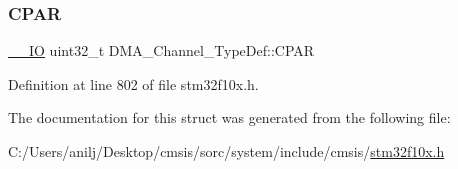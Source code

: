 \subsubsection{\texorpdfstring{C\+P\+AR}{CPAR}}
{\footnotesize\ttfamily \hyperlink{core__sc300_8h_aec43007d9998a0a0e01faede4133d6be}{\+\_\+\+\_\+\+IO} uint32\+\_\+t D\+M\+A\+\_\+\+Channel\+\_\+\+Type\+Def\+::\+C\+P\+AR}



Definition at line 802 of file stm32f10x.\+h.



The documentation for this struct was generated from the following file\+:\begin{DoxyCompactItemize}
\item 
C\+:/\+Users/anilj/\+Desktop/cmsis/sorc/system/include/cmsis/\hyperlink{stm32f10x_8h}{stm32f10x.\+h}\end{DoxyCompactItemize}
